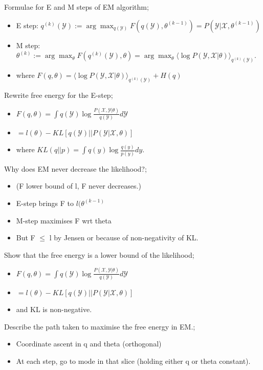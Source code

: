 \documentclass{article}
\begin{document}
Formulae for E and M steps of EM algorithm; \begin{itemize}
	\item E step: $q^{(k)}(\mathcal{Y}):=\arg\max_{q(\mathcal{Y})}  F(q(\mathcal{Y}),\theta^{(k-1)}) = P(\mathcal{Y}|\mathcal{X},\theta^{(k-1)})$
	\item M step: $\theta^{(k)}:=\arg\max_\theta F(q^{(k)}(\mathcal{Y}),\theta)=\arg\max_{\theta}\langle \log P(\mathcal{Y}, \mathcal{X}|\theta)\rangle_{q^{(k)}(\mathcal{Y})}$.
	\item where $F(q,\theta)=\langle \log P(\mathcal{Y}, \mathcal{X}|\theta)\rangle_{q^{(k)}(\mathcal{Y})}+H(q)$
\end{itemize}

Rewrite free energy for the E-step; \begin{itemize}
	\item $F(q,\theta) = \int q(\mathcal{Y})\log \frac{P(\mathcal{X, Y}|\theta)}{q(\mathcal{Y})}d\mathcal{Y}$
	\item $= l(\theta) - KL[q(\mathcal{Y})||P(\mathcal{Y}|\mathcal{X},\theta)]$
	\item where $KL(q||p) = \int q(y)\log\frac{q(y)}{p(y)}dy$.
\end{itemize}

Why does EM never decrease the likelihood?; \begin{itemize}
    \item (F lower bound of l, F never decreases.)
    \item E-step brings F to $l(\theta^{(k-1)}$
    \item M-step maximises F wrt theta 
    \item But F $\leq$ l by Jensen or because of non-negativity of KL.
\end{itemize}

Show that the free energy is a lower bound of the likelihood; \begin{itemize}
	\item $F(q,\theta) = \int q(\mathcal{Y})\log \frac{P(\mathcal{X, Y}|\theta)}{q(\mathcal{Y})}d\mathcal{Y}$
	\item $= l(\theta) - KL[q(\mathcal{Y})||P(\mathcal{Y}|\mathcal{X},\theta)]$
	\item and KL is non-negative.
\end{itemize}

Describe the path taken to maximise the free energy in EM.; \begin{itemize}
    \item Coordinate ascent in q and theta (orthogonal)
    \item At each step, go to mode in that slice (holding either q or theta constant).
\end{itemize}
\end{document}
